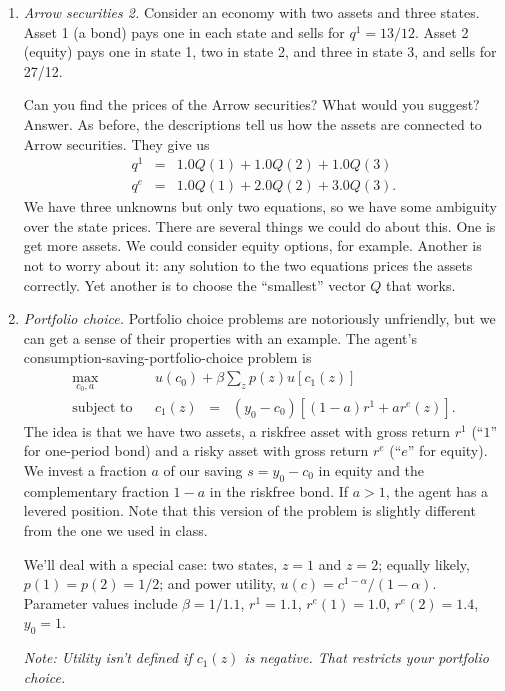 \documentclass[11pt]{article}
\begin{document}
\begin{enumerate}
\item {\it Arrow securities 2.\/}
Consider an economy with two assets and three states.
Asset 1 (a bond) pays one in each state and sells for $q^1 = 13/12$.
Asset 2 (equity) pays one in state 1, two in state 2, and three in state 3,
and sells for 27/12.

Can you find the prices of the Arrow securities?
What would you suggest?
%
Answer.
As before, the descriptions tell us how the assets are connected to Arrow securities.
They give us
\begin{eqnarray*}
    q^1 &=& 1.0 Q(1) + 1.0 Q(2) + 1.0 Q(3) \\
    q^e &=& 1.0 Q(1) + 2.0 Q(2) + 3.0 Q(3) .
\end{eqnarray*}
We have three unknowns but only two equations, so we have some ambiguity over
the state prices.
There are several things we could do about this.
One is get more assets.  We could consider equity options, for example.
Another is not to worry about it:  any solution to the two equations prices
the assets correctly.
Yet another is to choose the ``smallest'' vector $Q$ that works.

\item {\it Portfolio choice.\/}
Portfolio choice problems are notoriously unfriendly,
but we can get a sense of their properties with an example.
The agent's consumption-saving-portfolio-choice problem is
\begin{eqnarray*}
   \max_{c_0, a} &&  u(c_0) + \beta \sum_z p(z) u[c_1(z)] \\
   \mbox{subject to} &&  c_1(z)\;\;=\;\; (y_0-c_0)[(1-a) r^1 + a r^e(z)] .
\end{eqnarray*}
The idea is that we have two assets,
a riskfree asset with gross return $r^1$ (``$1$'' for one-period bond)
and a risky asset with gross return $r^e$  (``$e$'' for equity).
We invest a fraction $a$ of our saving $s = y_0 - c_0$
in equity and the complementary
fraction $1-a$ in the riskfree bond.
If $a>1$, the agent has a levered position.
Note that this version of the problem is slightly different from the one we used in class.

We'll deal with a special case:
two states, $z=1$ and $z=2$;
equally likely, $p(1) = p(2) = 1/2$;
and power utility, $u(c) = c^{1-\alpha}/(1-\alpha)$.
Parameter values include
$\beta = 1/1.1$,
$r^1 = 1.1$,
$r^e(1) = 1.0$, $r^e(2) = 1.4$,
$ y_0 = 1$.

{\it Note:  Utility isn't defined
if $c_1(z)$ is negative.
That restricts your portfolio choice.\/}


\end{enumerate}
\end{document}

